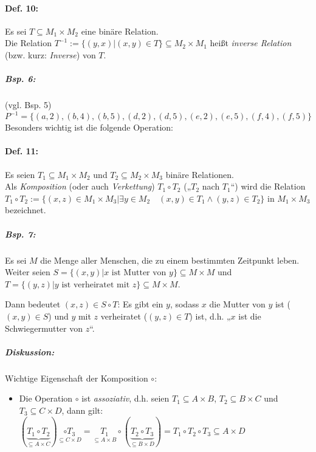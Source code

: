 \paragraph{Def. 10:} \parskp
Es sei $T \subseteq M_1 \times M_2$ eine binäre Relation. \\
Die Relation $T^{-1}:=\{(y,x)|(x,y)\in T\} \subseteq M_2\times M_1$ heißt \emph{inverse Relation} (bzw. kurz: \emph{Inverse}) von $T$.

\subparagraph{Bsp. 6:} (vgl. Bsp. 5)\\
$P^{-1}=\{(a,2), (b,4), (b,5), (d,2), (d,5), (e,2), (e,5), (f,4), (f,5)\}$\\
Besonders wichtig ist die folgende Operation:

\paragraph{Def. 11:} \parskp
Es seien $T_1 \subseteq M_1\times M_2$ und $T_2 \subseteq M_2 \times M_3$ binäre Relationen.\\
Als \emph{Komposition} (oder auch \emph{Verkettung}) $T_1 \circ T_2$ („$T_2$ nach $T_1$“) wird die Relation $T_1 \circ T_2 := \{ (x,z) \in M_1 \times M_3 | \exists y \in M_2 \quad (x,y) \in T_1 \wedge (y,z) \in T_2\}$ in $M_1 \times M_3$ bezeichnet.

\subparagraph{Bsp. 7:} \parskp
Es sei $M$ die Menge aller Menschen, die zu einem bestimmten Zeitpunkt leben. Weiter seien $S=\{(x,y)| x \text{ ist Mutter von }y\} \subseteq M\times M$ und $T=\{(y,z)| y \text{ ist verheiratet mit }z\}\subseteq M\times M$.

Dann bedeutet $(x,z)\in S\circ T$: Es gibt ein $y$, sodass $x$ die Mutter von $y$ ist ($(x,y)\in S$) und $y$ mit $z$ verheiratet ($(y,z)\in T$) ist, d.h. „$x$ ist die Schwiegermutter von $z$“.

\subparagraph{Diskussion:} Wichtige Eigenschaft der Komposition $\circ$:
\begin{itemize}
\item Die Operation $\circ$ ist \emph{assoziativ}, d.h. seien $T_1\subseteq A\times B$, $T_2\subseteq B\times C$ und $T_3 \subseteq C\times D$, dann gilt:\\
$(\underbrace{T_1 \circ T_2}_{\subseteq A\times C})\underset{\subseteq C \times D}{\circ T_3} = \underset{\subseteq A \times B}{T_1} \circ (\underbrace{T_2 \circ T_3}_{\subseteq B \times D}) = T_1 \circ T_2 \circ T_3 \subseteq A \times D$
\end{itemize}

